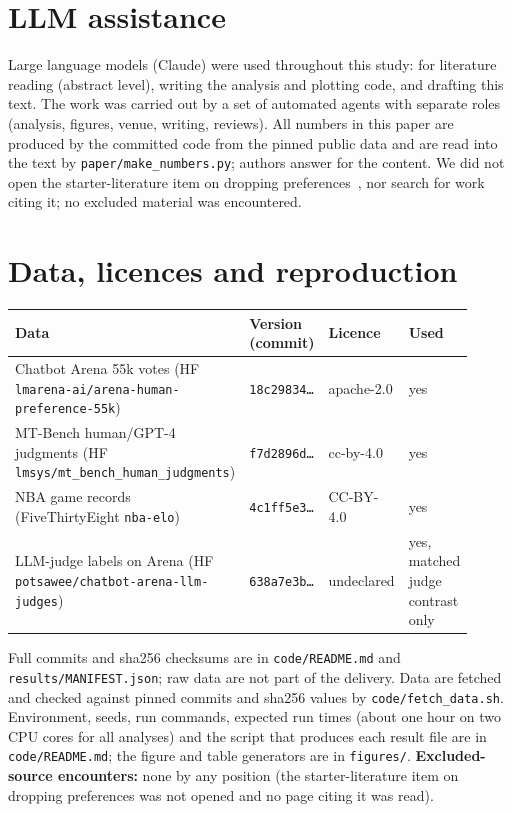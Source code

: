\documentclass{article}
\begin{document}
\section*{LLM assistance}
Large language models (Claude) were used throughout this study: for literature reading (abstract level), writing the analysis and plotting code, and drafting this text. The work was carried out by a set of automated agents with separate roles (analysis, figures, venue, writing, reviews). All numbers in this paper are produced by the committed code from the pinned public data and are read into the text by \texttt{paper/make\_numbers.py}; authors answer for the content. We did not open the starter-literature item on dropping preferences~\cite{huang2025dropping}, nor search for work citing it; no excluded material was encountered.


{\small}

\appendix
\section{Data, licences and reproduction}
\label{app:repro}
\begin{center}\small
\begin{tabular}{@{}p{0.46\linewidth}p{0.17\linewidth}p{0.11\linewidth}p{0.17\linewidth}@{}}
\toprule
Data & Version (commit) & Licence & Used\\\midrule
Chatbot Arena 55k votes (HF \texttt{lmarena-ai/arena-human-preference-55k}) & \texttt{18c29834\ldots} & apache-2.0 & yes\\
MT-Bench human/GPT-4 judgments (HF \texttt{lmsys/mt\_bench\_human\_judgments}) & \texttt{f7d2896d\ldots} & cc-by-4.0 & yes\\
NBA game records (FiveThirtyEight \texttt{nba-elo}) & \texttt{4c1ff5e3\ldots} & CC-BY-4.0 & yes\\
LLM-judge labels on Arena (HF \texttt{potsawee/chatbot-arena-llm-judges}) & \texttt{638a7e3b\ldots} & undeclared & yes, matched judge contrast only\\
\bottomrule
\end{tabular}
\end{center}
Full commits and sha256 checksums are in \texttt{code/README.md} and \texttt{results/MANIFEST.json}; raw data are not part of the delivery. Data are fetched and checked against pinned commits and sha256 values by \texttt{code/fetch\_data.sh}. Environment, seeds, run commands, expected run times (about one hour on two CPU cores for all analyses) and the script that produces each result file are in \texttt{code/README.md}; the figure and table generators are in \texttt{figures/}. \textbf{Excluded-source encounters:} none by any position (the starter-literature item on dropping preferences was not opened and no page citing it was read).
\end{document}

